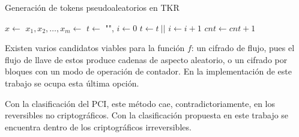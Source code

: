 \begin{algorithm}
  \caption{\label{tkr_rn} Generación de tokens pseudoaleatorios en TKR}
  \begin{algorithmic}[1]
      \State $ x \gets $ 
      \State $ x_1, x_2, \dots, x_m \gets $
      \State $ t \gets $ "", $ i \gets 0 $
          \State $ t \gets t \ || $ 
        \EndIf
        \State $ i \gets i + 1 $
      \EndWhile
      \State $ cnt \gets cnt + 1 $
    \EndFunction
  \end{algorithmic}
\end{algorithm}

Existen varios candidatos viables para la función $ f $: un cifrado de flujo,
pues el flujo de llave de estos produce cadenas de aspecto aleatorio, o un
cifrado por bloques con un modo de operación de contador. En la implementación
de este trabajo se ocupa esta última opción.

Con la clasificación del PCI, este método cae, contradictoriamente, en los
reversibles no criptográficos. Con la clasificación propuesta en este trabajo se
encuentra dentro de los criptográficos irreversibles.
